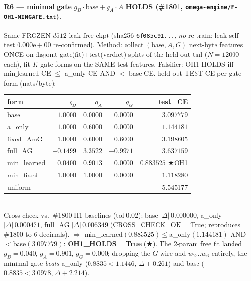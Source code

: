 \documentclass[11pt]{article}
\begin{document}
\paragraph{R6 --- minimal gate $g_B\!\cdot\!\text{base}+g_A\!\cdot\!A$ HOLDS (\#1801,
\texttt{omega-engine/F-OH1-MINGATE.txt}).}
Same FROZEN $d512$ leak-free ckpt (sha256 \texttt{6f085c91...}, \emph{no} re-train; leak self-test
$0.000\mathrm{e}{+}00$ re-confirmed). Method: collect $(\text{base},A,G)$ next-byte features
ONCE on disjoint gate(fit)$+$test(verdict) splits of the held-out tail ($N{=}12000$ each), fit
$K$ gate forms on the SAME test features. Falsifier: OH1 HOLDS iff $\text{min\_learned}$ CE
$\le$ a\_only CE AND $<$ base CE. held-out TEST CE per gate form (nats/byte):
\begin{tabular}{lrrrr}
\toprule
form & $g_B$ & $g_A$ & $g_G$ & test\_CE \\
\midrule
base        & $1.0000$ & $0.0000$ & $0.0000$ & $3.097779$ \\
a\_only     & $1.0000$ & $0.6000$ & $0.0000$ & $1.144181$ \\
fixed\_AmG  & $1.0000$ & $0.6000$ & $-0.6000$ & $3.198605$ \\
full\_AG    & $-0.1499$ & $3.3522$ & $-0.9971$ & $3.637159$ \\
min\_learned & $0.0400$ & $0.9013$ & $0.0000$ & $\mathbf{0.883525}$ \quad $\bigstar$OH1 \\
min\_fixed  & $1.0000$ & $1.0000$ & $0.0000$ & $1.118280$ \\
uniform     &          &          &          & $5.545177$ \\
\bottomrule
\end{tabular}\\
Cross-check vs.\ \#1800 H1 baselines (tol $0.02$): base $|\Delta|\,0.000000$, a\_only
$|\Delta|\,0.000431$, full\_AG $|\Delta|\,0.006349$ (CROSS\_CHECK\_OK$=$True; reproduces
\#1800 to 6 decimals). $\Rightarrow$ min\_learned$(0.883525)\le$a\_only$(1.144181)$ AND
$<$base$(3.097779)$: \textbf{OH1\_HOLDS$=$True} ($\bigstar$). The 2-param free fit landed
$g_B{=}0.040,\,g_A{=}0.901,\,g_G{=}0.000$; dropping the $G$ wire and $w_2\ldots w_6$ entirely,
the minimal gate \emph{beats} a\_only ($0.8835<1.1446$, $\Delta{+}0.261$) and base
($0.8835<3.0978$, $\Delta{+}2.214$).
\end{document}
